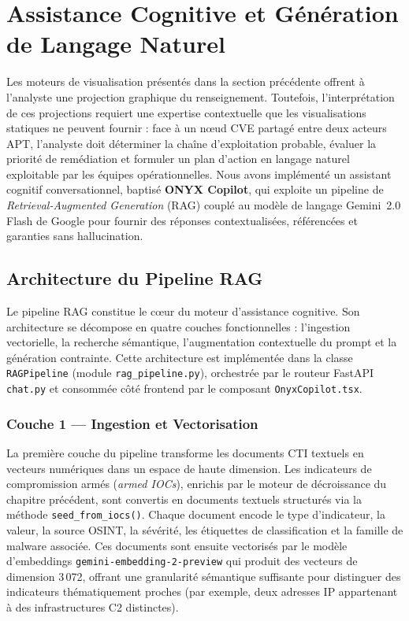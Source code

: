 \section{Assistance Cognitive et Génération de Langage Naturel}

Les moteurs de visualisation présentés dans la section précédente offrent à l'analyste une projection graphique du renseignement. Toutefois, l'interprétation de ces projections requiert une expertise contextuelle que les visualisations statiques ne peuvent fournir : face à un nœud CVE partagé entre deux acteurs APT, l'analyste doit déterminer la chaîne d'exploitation probable, évaluer la priorité de remédiation et formuler un plan d'action en langage naturel exploitable par les équipes opérationnelles. Nous avons implémenté un assistant cognitif conversationnel, baptisé \textbf{ONYX Copilot}, qui exploite un pipeline de \textit{Retrieval-Augmented Generation} (RAG) couplé au modèle de langage Gemini~2.0 Flash de Google pour fournir des réponses contextualisées, référencées et garanties sans hallucination.

\subsection{Architecture du Pipeline RAG}

Le pipeline RAG constitue le cœur du moteur d'assistance cognitive. Son architecture se décompose en quatre couches fonctionnelles : l'ingestion vectorielle, la recherche sémantique, l'augmentation contextuelle du prompt et la génération contrainte. Cette architecture est implémentée dans la classe \texttt{RAGPipeline} (module \texttt{rag\_pipeline.py}), orchestrée par le routeur FastAPI \texttt{chat.py} et consommée côté frontend par le composant \texttt{OnyxCopilot.tsx}.

\subsubsection{Couche 1 --- Ingestion et Vectorisation}

La première couche du pipeline transforme les documents CTI textuels en vecteurs numériques dans un espace de haute dimension. Les indicateurs de compromission armés (\textit{armed IOCs}), enrichis par le moteur de décroissance du chapitre précédent, sont convertis en documents textuels structurés via la méthode \texttt{seed\_from\_iocs()}. Chaque document encode le type d'indicateur, la valeur, la source OSINT, la sévérité, les étiquettes de classification et la famille de malware associée. Ces documents sont ensuite vectorisés par le modèle d'embeddings \texttt{gemini-embedding-2-preview} qui produit des vecteurs de dimension 3\,072, offrant une granularité sémantique suffisante pour distinguer des indicateurs thématiquement proches (par exemple, deux adresses IP appartenant à des infrastructures C2 distinctes).

